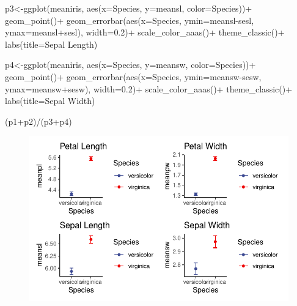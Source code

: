 \documentclass[
  letterpaper,
  DIV=11,
  numbers=noendperiod]{scrartcl}
\newenvironment{Shaded}{\begin{snugshade}}{\end{snugshade}}
\newcommand{\AttributeTok}[1]{\textcolor[rgb]{0.40,0.45,0.13}{#1}}
\newcommand{\FloatTok}[1]{\textcolor[rgb]{0.68,0.00,0.00}{#1}}
\newcommand{\FunctionTok}[1]{\textcolor[rgb]{0.28,0.35,0.67}{#1}}
\newcommand{\NormalTok}[1]{\textcolor[rgb]{0.00,0.23,0.31}{#1}}
\newcommand{\OtherTok}[1]{\textcolor[rgb]{0.00,0.23,0.31}{#1}}
\newcommand{\SpecialCharTok}[1]{\textcolor[rgb]{0.37,0.37,0.37}{#1}}
\newcommand{\StringTok}[1]{\textcolor[rgb]{0.13,0.47,0.30}{#1}}
\begin{document}
\begin{Shaded}
\begin{Highlighting}[]
\NormalTok{p3}\OtherTok{\textless{}{-}}\FunctionTok{ggplot}\NormalTok{(meaniris, }\FunctionTok{aes}\NormalTok{(}\AttributeTok{x=}\NormalTok{Species, }\AttributeTok{y=}\NormalTok{meansl, }\AttributeTok{color=}\NormalTok{Species))}\SpecialCharTok{+}
  \FunctionTok{geom\_point}\NormalTok{()}\SpecialCharTok{+}
  \FunctionTok{geom\_errorbar}\NormalTok{(}\FunctionTok{aes}\NormalTok{(}\AttributeTok{x=}\NormalTok{Species, }\AttributeTok{ymin=}\NormalTok{meansl}\SpecialCharTok{{-}}\NormalTok{sesl, }\AttributeTok{ymax=}\NormalTok{meansl}\SpecialCharTok{+}\NormalTok{sesl), }\AttributeTok{width=}\FloatTok{0.2}\NormalTok{)}\SpecialCharTok{+}
  \FunctionTok{scale\_color\_aaas}\NormalTok{()}\SpecialCharTok{+}
  \FunctionTok{theme\_classic}\NormalTok{()}\SpecialCharTok{+}
  \FunctionTok{labs}\NormalTok{(}\AttributeTok{title=}\StringTok{\textquotesingle{}Sepal Length\textquotesingle{}}\NormalTok{)}

\NormalTok{p4}\OtherTok{\textless{}{-}}\FunctionTok{ggplot}\NormalTok{(meaniris, }\FunctionTok{aes}\NormalTok{(}\AttributeTok{x=}\NormalTok{Species, }\AttributeTok{y=}\NormalTok{meansw, }\AttributeTok{color=}\NormalTok{Species))}\SpecialCharTok{+}
  \FunctionTok{geom\_point}\NormalTok{()}\SpecialCharTok{+}
  \FunctionTok{geom\_errorbar}\NormalTok{(}\FunctionTok{aes}\NormalTok{(}\AttributeTok{x=}\NormalTok{Species, }\AttributeTok{ymin=}\NormalTok{meansw}\SpecialCharTok{{-}}\NormalTok{sesw, }\AttributeTok{ymax=}\NormalTok{meansw}\SpecialCharTok{+}\NormalTok{sesw), }\AttributeTok{width=}\FloatTok{0.2}\NormalTok{)}\SpecialCharTok{+}
  \FunctionTok{scale\_color\_aaas}\NormalTok{()}\SpecialCharTok{+}
  \FunctionTok{theme\_classic}\NormalTok{()}\SpecialCharTok{+}
  \FunctionTok{labs}\NormalTok{(}\AttributeTok{title=}\StringTok{\textquotesingle{}Sepal Width\textquotesingle{}}\NormalTok{)}

\NormalTok{(p1}\SpecialCharTok{+}\NormalTok{p2)}\SpecialCharTok{/}\NormalTok{(p3}\SpecialCharTok{+}\NormalTok{p4)}
\end{Highlighting}
\end{Shaded}

\begin{figure}[H]

{\centering \includegraphics{t_test_files/figure-pdf/unnamed-chunk-16-1.pdf}

}

\end{figure}
\end{document}
